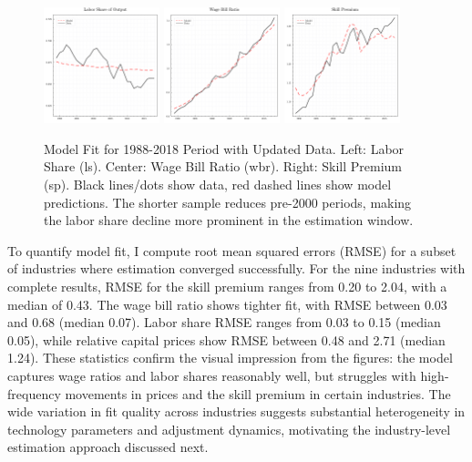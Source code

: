 \documentclass[12pt]{article}
\begin{document}
\begin{figure}[H]
 \centering
 \includegraphics[width=0.3\textwidth]{../images/fig:updated_ind_estimation_ls_doc.pdf}
 \hfill
 \includegraphics[width=0.3\textwidth]{../images/fig:updated_ind_estimation_wbr_doc.pdf}
 \hfill
 \includegraphics[width=0.3\textwidth]{../images/fig:updated_ind_estimation_sp_doc.pdf}
 \caption{\label{fig:korv_estimation_extended_industry} Model Fit for 1988-2018 Period with Updated Data. Left: Labor Share (ls). Center: Wage Bill Ratio (wbr). Right: Skill Premium (sp). Black lines/dots show data, red dashed lines show model predictions. The shorter sample reduces pre-2000 periods, making the labor share decline more prominent in the estimation window.}
\end{figure}

To quantify model fit, I compute root mean squared errors (RMSE) for a subset of industries where estimation converged successfully. For the nine industries with complete results, RMSE for the skill premium ranges from 0.20 to 2.04, with a median of 0.43. The wage bill ratio shows tighter fit, with RMSE between 0.03 and 0.68 (median 0.07). Labor share RMSE ranges from 0.03 to 0.15 (median 0.05), while relative capital prices show RMSE between 0.48 and 2.71 (median 1.24). These statistics confirm the visual impression from the figures: the model captures wage ratios and labor shares reasonably well, but struggles with high-frequency movements in prices and the skill premium in certain industries. The wide variation in fit quality across industries suggests substantial heterogeneity in technology parameters and adjustment dynamics, motivating the industry-level estimation approach discussed next.
\end{document}
